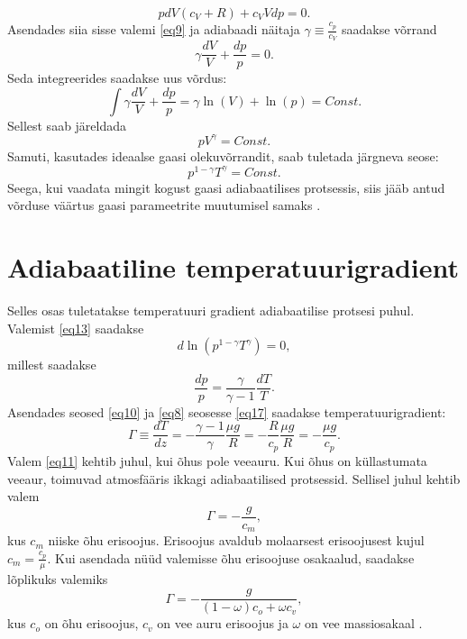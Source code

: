 \documentclass{trkut}%
\begin{document}
\begin{equation}\label{eq4}
pdV(c_V+R)+c_VVdp=0.
\end{equation}
Asendades siia sisse valemi \ref{eq9} ja adiabaadi näitaja $ \gamma \equiv \frac{c_p}{c_V}$ saadakse võrrand
\begin{equation}
\gamma \frac{dV}{V} + \frac{dp}{p} = 0.
\end{equation}
Seda integreerides saadakse uus võrdus:
\begin{equation}
 \int \gamma \frac{dV}{V} + \frac{dp}{p} = \gamma \ln(V) + \ln(p) = Const.
\end{equation}
Sellest saab järeldada
\begin{equation}
pV^\gamma = Const.
\end{equation}
Samuti, kasutades ideaalse gaasi olekuvõrrandit, saab tuletada järgneva seose:
\begin{equation}\label{eq13}
p^{1-\gamma}T^\gamma = Const.
\end{equation}
Seega, kui vaadata mingit kogust gaasi adiabaatilises protsessis, siis jääb antud võrduse väärtus gaasi parameetrite muutumisel samaks \parencite[4--8]{JKtermo}.

\section{Adiabaatiline temperatuurigradient }
Selles osas tuletatakse temperatuuri gradient adiabaatilise protsesi puhul. Valemist \ref{eq13} saadakse
\begin{equation}
d\ln(p^{1-\gamma}T^\gamma) = 0,
\end{equation}
millest saadakse
\begin{equation}\label{eq17}
\frac{dp}{p} = \frac{\gamma}{\gamma-1}\frac{dT}{T}.
\end{equation}
Asendades seosed \ref{eq10} ja \ref{eq8} seosesse \ref{eq17} saadakse temperatuurigradient:
\begin{equation}\label{eq11}
\Gamma \equiv \frac{dT}{dz}=-\frac{\gamma-1}{\gamma} \frac{\mu g}{R} = -\frac{R}{c_p}\frac{\mu g}{R} = -\frac{\mu g}{c_p}.
\end{equation}
Valem \ref{eq11} kehtib juhul, kui õhus pole veeauru. Kui õhus on küllastumata veeaur, toimuvad atmosfääris ikkagi adiabaatilised protsessid. Sellisel juhul kehtib valem 
\begin{equation}
\Gamma = -\frac{g}{c_m} ,
\end{equation}
kus $c_m$ niiske õhu erisoojus. Erisoojus avaldub molaarsest erisoojusest kujul $c_m=\frac{c_p}{\mu}$. Kui asendada nüüd valemisse õhu erisoojuse osakaalud, saadakse lõplikuks valemiks
\begin{equation}\label{eq12}
\Gamma = -\frac{g}{(1-\omega)c_{o} + \omega c_{v}} ,
\end{equation}
kus $c_{o}$ on õhu erisoojus, $c_{v}$ on vee auru erisoojus ja $\omega$ on vee massiosakaal \parencite[36]{raamat2}.
\end{document}

